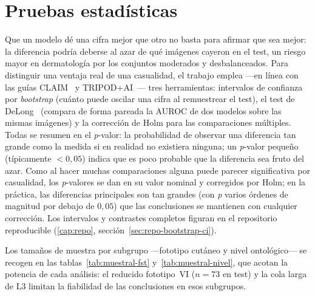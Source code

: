 \section{Pruebas estadísticas}
\label{sec:estadistica}

Que un modelo dé una cifra mejor que otro no basta para afirmar que
sea mejor: la diferencia podría deberse al azar de qué imágenes
cayeron en el test, un riesgo mayor en dermatología por los conjuntos
moderados y desbalanceados. Para distinguir una ventaja real de una
casualidad, el trabajo emplea ---en línea con las guías
CLAIM~\cite{claim2024} y TRIPOD+AI~\cite{tripodai2024}--- tres
herramientas: intervalos de confianza por \emph{bootstrap} (cuánto
puede oscilar una cifra al remuestrear el test), el test de
DeLong~\cite{delong1988} (compara de forma pareada la AUROC de dos
modelos sobre las mismas imágenes) y la corrección de Holm para las
comparaciones múltiples. Todas se resumen en el \emph{p}-valor: la
probabilidad de observar una diferencia tan grande como la medida si
en realidad no existiera ninguna; un \emph{p}-valor pequeño
(típicamente $<0{,}05$) indica que es poco probable que la diferencia
sea fruto del azar. Como al hacer muchas comparaciones alguna puede
parecer significativa por casualidad, los \emph{p}-valores se dan en su
valor nominal y corregidos por Holm; en la práctica, las diferencias
principales son tan grandes (con \emph{p} varios órdenes de magnitud
por debajo de $0{,}05$) que las conclusiones se mantienen con cualquier
corrección. Los intervalos y contrastes completos figuran en el
repositorio reproducible (\ref{cap:repo},
sección~\ref{sec:repo-bootstrap-ci}).

Los tamaños de muestra por subgrupo ---fototipo cutáneo y nivel
ontológico--- se recogen en las tablas~\ref{tab:muestral-fst}
y~\ref{tab:muestral-nivel}, que acotan la potencia de cada análisis: el
reducido fototipo~VI ($n = 73$ en test) y la cola larga de L3 limitan
la fiabilidad de las conclusiones en esos subgrupos.


